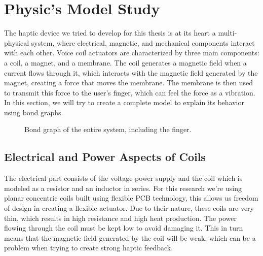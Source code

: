 \section{Physic's Model Study}
The haptic device we tried to develop for this thesis is at its heart a multi-physical system, where electrical, magnetic, and mechanical components interact with each other.
Voice coil actuators are characterized by three main components: a coil, a magnet, and a membrane. The coil generates a magnetic field when a current flows through it, which interacts with the magnetic field generated by the magnet, creating a force that moves the membrane. The membrane is then used to transmit this force to the user's finger, which can feel the force as a vibration.
In this section, we will try to create a complete model to explain its behavior using bond graphs.
\begin{figure}[H]
    \centering
    \resizebox{1\linewidth}{!}{
        
    } %
    \caption{Bond graph of the entire system, including the finger.}
    \label{fig: Total_bond-graph}
\end{figure}

\subsection{Electrical and Power Aspects of Coils}
The electrical part consists of the voltage power supply and the coil which is modeled as a resistor and an inductor in series. For this research we're using planar concentric coils built using flexible PCB technology, this allows us freedom of design in creating a flexible actuator.
Due to their nature, these coils are very thin, which results in high resistance and high heat production. The power flowing through the coil must be kept low to avoid damaging it. This in turn means that the magnetic field generated by the coil will be weak, which can be a problem when trying to create strong haptic feedback.

